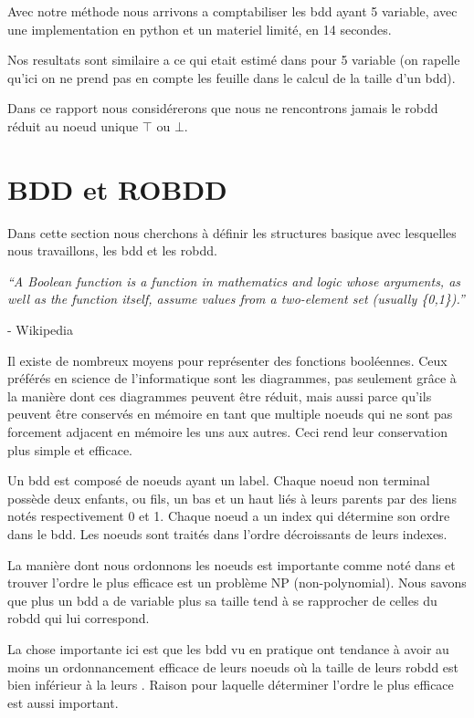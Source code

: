 \documentclass[french]{article}
\begin{document}
Avec notre méthode nous arrivons a comptabiliser les bdd ayant 5 variable, avec une implementation en python et un materiel limité, en 14 secondes.

Nos resultats sont similaire a ce qui etait estimé dans \cite{newton} pour 5 variable (on rapelle qu'ici on ne prend pas en compte les feuille dans le calcul de la taille d'un bdd).

Dans ce rapport nous considérerons que nous ne rencontrons jamais le robdd réduit au noeud unique \(\top\) ou \(\bot.\)
\newpage
\section{BDD et ROBDD}
Dans cette section nous cherchons à définir les structures basique avec lesquelles nous travaillons, les bdd et les robdd.

\begin{center}
\emph{“A Boolean function is a function in mathematics and logic whose arguments, as well as the function itself, assume values from a two-element set (usually \{0,1\}).”} 
\end{center}

- Wikipedia 
\vspace{5mm} %

Il existe de nombreux moyens pour représenter des fonctions booléennes. Ceux préférés en science de l'informatique sont les diagrammes, pas seulement grâce à la manière dont ces diagrammes peuvent être réduit, mais aussi parce qu'ils peuvent être conservés en mémoire en tant que multiple noeuds qui ne sont pas forcement adjacent en mémoire les uns aux autres. Ceci rend leur conservation plus simple et efficace.

Un bdd est composé de noeuds ayant un label. Chaque noeud non terminal possède deux enfants, ou fils, un bas et un haut liés à leurs parents par des liens notés respectivement 0 et 1. Chaque noeud a un index qui détermine son ordre dans le bdd. Les noeuds sont traités dans l'ordre décroissants de leurs indexes.

La manière dont nous ordonnons les noeuds est importante comme noté dans \cite{newton} et trouver l'ordre le plus efficace est un problème NP (non-polynomial). Nous savons que plus un bdd a de variable plus sa taille tend à se rapprocher de celles du robdd qui lui correspond.

La chose importante ici est que les bdd vu en pratique ont tendance à avoir au moins un ordonnancement efficace de leurs noeuds où la taille de leurs robdd est bien inférieur à la leurs \cite{gropl}. Raison pour laquelle déterminer l'ordre le plus efficace est aussi important.
\end{document}
